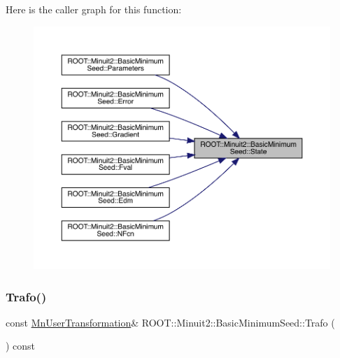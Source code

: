 Here is the caller graph for this function\+:\nopagebreak
\begin{figure}[H]
\begin{center}
\leavevmode
\includegraphics[width=350pt]{de/d50/classROOT_1_1Minuit2_1_1BasicMinimumSeed_a92e671b9a963d83076238c2e2b283e7c_icgraph}
\end{center}
\end{figure}
\mbox{\label{classROOT_1_1Minuit2_1_1BasicMinimumSeed_aa40157cea0a8a75b56af25bbc64f8d39}} 
\subsubsection{\texorpdfstring{Trafo()}{Trafo()}\hspace{0.1cm}{\footnotesize\ttfamily [1/2]}}
{\footnotesize\ttfamily const \mbox{\hyperlink{classROOT_1_1Minuit2_1_1MnUserTransformation}{Mn\+User\+Transformation}}\& R\+O\+O\+T\+::\+Minuit2\+::\+Basic\+Minimum\+Seed\+::\+Trafo (\begin{DoxyParamCaption}{ }\end{DoxyParamCaption}) const\hspace{0.3cm}{\ttfamily [inline]}}

\mbox{\label{classROOT_1_1Minuit2_1_1BasicMinimumSeed_aa40157cea0a8a75b56af25bbc64f8d39}} 
